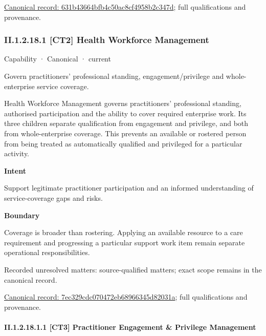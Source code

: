 {\footnotesize \href{../../../../../../../continuum/strategy/capability/631b43664bfb4c50ac8cf4958b2c347d.md}{Canonical record: 631b43664bfb4c50ac8cf4958b2c347d}; full qualifications and provenance.}\par
\subsubsection*{II.1.2.18.1 [CT2] Health Workforce Management}
\label{navigation:II.1.2.18.1}

\label{element:7ec329cdc070472eb68966345d82031a}
{\small Capability · Canonical · current}\par

Govern practitioners’ professional standing, engagement/privilege and whole-enterprise service coverage.



Health Workforce Management governs practitioners' professional standing, authorised participation and the ability to cover required enterprise work. Its three children separate qualification from engagement and privilege, and both from whole-enterprise coverage. This prevents an available or rostered person from being treated as automatically qualified and privileged for a particular activity.



\textbf{Intent}



Support legitimate practitioner participation and an informed understanding of service-coverage gaps and risks.



\textbf{Boundary}



Coverage is broader than rostering. Applying an available resource to a care requirement and progressing a particular support work item remain separate operational responsibilities.


{\small Recorded unresolved matters: source-qualified matters; exact scope remains in the canonical record.}\par
{\footnotesize \href{../../../../../../../continuum/strategy/capability/7ec329cdc070472eb68966345d82031a.md}{Canonical record: 7ec329cdc070472eb68966345d82031a}; full qualifications and provenance.}\par
\paragraph*{II.1.2.18.1.1 [CT3] Practitioner Engagement \& Privilege Management}
\label{navigation:II.1.2.18.1.1}

